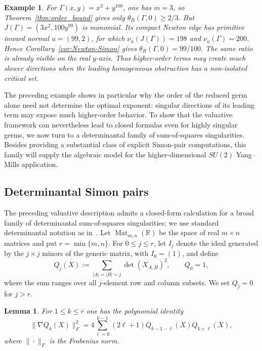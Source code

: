 \documentclass[11pt]{article}
\newtheorem{lemma}[theorem]{Lemma}
\newtheorem{example}[theorem]{Example}
\theoremstyle{definition}
\theoremstyle{remark}
\begin{document}
\begin{example}
\label{ex:x3-y100}
For $\Gamma(x,y)=x^3+y^{100}$, one has $m=3$, so Theorem~\ref{thm:order_bound} gives only $\theta_R(\Gamma,0)\ge2/3$. But $J(\Gamma)=(3x^2,100y^{99})$ is monomial. Its compact Newton edge has primitive inward normal $u=(99,2)$, for which $\nu_u(J(\Gamma))=198$ and $\nu_u(\Gamma)=200$. Hence Corollary~\ref{cor:Newton-Simon} gives $\theta_R(\Gamma,0)=99/100$. The same ratio is already visible on the real $y$-axis. Thus higher-order terms may create much slower directions when the leading homogeneous obstruction has a non-isolated critical set.
\end{example}

The preceding example shows in particular why the order of the reduced germ alone need not determine the optimal exponent: singular directions of its leading term may expose much higher-order behavior. To show that the valuative framework can nevertheless lead to closed formulas even for highly singular germs, we now turn to a determinantal family of sum-of-squares singularities. Besides providing a substantial class of explicit Simon-pair computations, this family will supply the algebraic model for the higher-dimensional $SU(2)$ Yang--Mills application.


\subsection{Determinantal Simon pairs}\label{subsec:determinantal}

The preceding valuative description admits a closed-form calculation for a broad family of determinantal sum-of-squares singularities; we use standard determinantal notation as in~\cite{BrunsVetter1988}. Let $\operatorname{Mat}_{m,n}(\mathbb R)$ be the space of real $m\times n$ matrices and put $r=\min\{m,n\}$. For $0\le j\le r$, let $I_j$ denote the ideal generated by the $j\times j$ minors of the generic matrix, with $I_0=(1)$, and define
$$
Q_j(X):=\sum_{|A|=|B|=j}\det(X_{A,B})^2,
\qquad Q_0=1,
$$
where the sum ranges over all $j$-element row and column subsets. We set $Q_j=0$ for $j>r$.

\begin{lemma}\label{lem:det-gradient}
For $1\le k\le r$ one has the polynomial identity
$$
\|\nabla Q_k(X)\|_F^2
=4\sum_{\ell=0}^{k-1}(2\ell+1)Q_{k-1-\ell}(X)Q_{k+\ell}(X),
$$
where $\|\cdot\|_F$ is the Frobenius norm.
\end{lemma}
\end{document}
